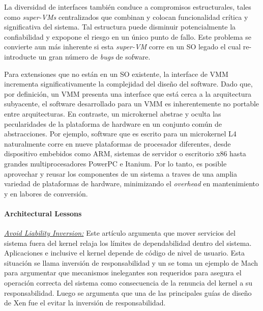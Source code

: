 La diversidad de interfaces también conduce a compromisos estructurales, tales como \emph{super-VMs} centralizados que combinan y colocan funcionalidad crítica y significativa del sistema. Tal estructura puede disminuir potencialmente la confiabilidad y expopone el riesgo en un único punto de fallo. Este problema se convierte aun más inherente si esta \emph{super-VM} corre en un SO legado el cual re-introducte un gran número de \emph{bugs} de sofware.

Para extensiones que no están en un SO existente, la interface de VMM incrementa significativamente la complejidad del diseño del software. Dado que, por definición, un VMM presenta una interface que está cerca a la arquitectura subyacente, el software desarrollado para un VMM es inherentemente no portable entre arquitecturas. En contraste, un microkernel abstrae y oculta las pecularidades de la plataforma de hardware en un conjunto común de abstracciones. Por ejemplo, software que es escrito para un microkernel L4 naturalmente corre en nueve plataformas de procesador diferentes, desde dispositivo embebidos como ARM, sistemas de servidor o escritorio x86 hasta grandes multiprocesadores PowerPC e Itanium. Por lo tanto, es posible aprovechar y reusar los componentes de un sistema a traves de una amplia variedad de plataformas de hardware, minimizando el \emph{overhead} en mantenimiento y en labores de conversión.

\paragraph{\textnormal{\textbf{Architectural Lessons}}}
\underline{\emph{Avoid Liability Inversion:}} Este artículo argumenta que mover servicios del sistema fuera del kernel relaja los límites de dependabilidad dentro del sistema. Aplicaciones e inclusive el kernel depende de código de nivel de usuario. Esta situación se llama inversión de responsabilidad y un se toma un ejemplo de Mach para argumentar que mecanismos inelegantes son requeridos para asegura el operación correcta del sistema como consecuencia de la renuncia del kernel a su responsabilidad. Luego se argumenta que una de las principales guías de diseño de Xen fue el evitar la inversión de responsabilidad.

